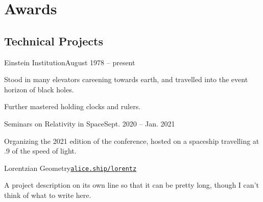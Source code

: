 \documentclass{resume}
\begin{document}
\noindent 
\begin{minipage}[t]{.41\textwidth} \vspace{0pt}
\renewcommand{\refname}{Publications}


\nocite{*}
\sectionlineskip

\section{Awards}
    \medskip
    
    
\sectionlineskip

\end{minipage}
\hfill 
\begin{minipage}[t]{.57\textwidth} 
\vspace{0pt} %
\subsection{Technical Projects} 
\begin{content}
    \begin{project}{Einstein Institution}{August 1978 -- present}
        \item Stood in many elevators careening towards earth, and travelled into the event horizon of black holes. 
        \item Further mastered holding clocks and rulers.
    \end{project}
    
    \begin{project}{Seminars on Relativity in Space}{Sept. 2020 -- Jan. 2021}
    \item Organizing the 2021 edition of the conference, hosted on a spaceship travelling at .9 of the speed of light.
    \end{project}
    
    \begin{project}{Lorentzian Geometry}{\normalfont\href{https://alice.ship/lorentz}{\texttt{alice.ship/lorentz}}}
    \item A project description on its own line so that it can be pretty long, though I can't think of what to write here.  
    \end{project}
    
\end{content}
\end{minipage}
\end{document}
